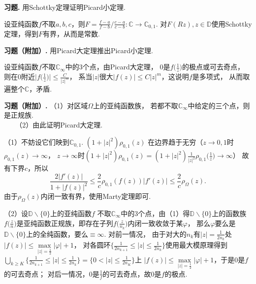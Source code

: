 \textbf{习题. } 用Schottky定理证明Picard小定理.

\begin{proofc}
    设亚纯函数$f$不取$a,b,c$，则$F=\frac{f-a}{f-b}\big/\frac{c-a}{c-b}\colon
    \mathbb{C}\rightarrow\mathbb{C}_{0,1}$.
    对$F(Rz),z\in\mathbb{D}$使用Schottky定理，得到$F$有界，从而是常数.
\end{proofc}

\textbf{习题（附加）.} 用Picard大定理推出Picard小定理.

\begin{proofc}
    设亚纯函数$f$不取$\mathbb{C}_\infty$中的$3$个点，由Picard大定理，
    $0$是$f\big(\frac{1}{z}\big)$的极点或可去奇点，
    则在$0$附近$\big|f\big(\frac{1}{z}\big)\big|\leq\frac{C}{|z|^m}$，
    系当$|z|$很大$|f(z)|\leq C|z|^m$，这说明$f$是多项式，
    从而取遍整个$\mathbb{C}$，矛盾.
\end{proofc}

\textbf{习题（附加）.} （1）对区域$\Omega$上的亚纯函数族，
若都不取$\mathbb{C}_\infty$中给定的三个点，则是正规族.\\
\qquad\qquad\quad\ \ \ \,（2）由此证明Picard大定理.

\begin{proofc}
    （1）不妨设它们映到$\mathbb{C}_{0,1}$. $(1+|z|^2)\rho_{0,1}(z)$
    在边界趋于无穷（$z\rightarrow0,1$时$\rho_{0,1}(z)\rightarrow\infty$，
    $z\rightarrow\infty$时$(1+|z|^2)\rho_{0,1}(z)
    =(1+|z|^2)\frac{1}{|z|^2}\rho_{0,1}\big(\frac{1}{z}\big)\rightarrow\infty$）
    故有下界$c$，所以
    $$\frac{2|f'(z)|}{1+|f(z)|^2}\leq \frac{2}{c}\rho_{0,1}(f(z))|f'(z)|
    \leq \frac{2}{c}\rho_\Omega(z).$$
    由于$\rho_\Omega(z)$内闭一致有界，使用Marty定理即可.

    （2）设$\mathbb{D}\backslash\{0\}$上的亚纯函数$f$
    不取$\mathbb{C}_\infty$中的$3$个点，由（1）得$\mathbb{D}\backslash\{0\}$上的函数族
    $f\big(\frac{z}{n}\big)$是亚纯函数正规族，即存在子列$f\big(\frac{z}{n_k}\big)$内闭一致收敛于某$\varphi$，
    那么$\varphi$要么是$\mathbb{D}\backslash\{0\}$上的全纯函数，要么$\equiv\infty$. 对前一情况，
    由于对大的$n_k$有$|z|=\frac{1}{2n_k}$处$|f(z)|\leq\max\limits_{|z|=\frac{1}{2}}|\varphi|+1$，
    对各圆环$\{\frac{1}{2n_{k+1}}\leq|z|\leq\frac{1}{2n_k}\}$使用最大模原理得到
    $\bigcup\limits_{k\geq K}\{\frac{1}{2n_{k+1}}\leq|z|\leq\frac{1}{2n_k}\}=\{0<|z|\leq\frac{1}{2n_K}\}$上
    $|f(z)|\leq\max\limits_{|z|=\frac{1}{2}}|\varphi|+1$，于是$0$是$f$的可去奇点；
    对后一情况，$0$是$\frac{1}{f}$的可去奇点，故$0$是$f$的极点.
\end{proofc}

